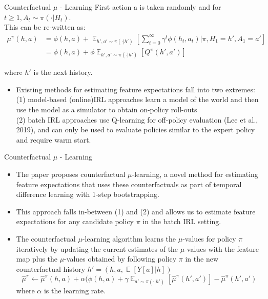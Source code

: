 \documentclass{beamer}
\DeclareMathOperator{\EX}{\mathbb{E}}%
\begin{document}
\begin{frame}{Counterfactual $\mu$ - Learning}
    First action a is taken randomly and for $t \geq 1, A_t \sim \pi(\cdot | H_t)$. \\
    This can be re-written as:
    \vspace{-0.3cm}
    \begin{equation*}
        \begin{split}
            \mu^\pi(h,a) & = \phi(h,a) + \EX_{h', a' \sim \pi(\cdot|h')} [\sum_{t=0}^\infty\gamma^t \phi(h_t, a_t) | \pi, H_1 = h', A_1 = a'] \\
             & = \phi(h,a) + \phi\EX_{h', a' \sim \pi(\cdot|h')} [Q^\pi(h', a')]
        \end{split}
    \end{equation*}

    where $h'$ is the next history.

    \begin{itemize}
        \item Existing methods for estimating feature expectations fall into two extremes: \\
        (1) model-based (online)IRL approaches learn a model of the world and then use the model as a simulator to obtain on-policy roll-outs  \\
        (2) batch IRL approaches use Q-learning for off-policy evaluation (Lee et al., 2019), and can only be used to evaluate policies similar to the expert policy and require warm start.
    \end{itemize}
    
\end{frame}

\begin{frame}{Counterfactual $\mu$ - Learning}
    \begin{itemize}
        \item The paper proposes counterfactual $\mu$-learning, a novel method for estimating feature expectations that uses these counterfactuals as part of temporal difference learning with 1-step bootstrapping. 
        \item This approach falls in-between (1) and (2) and allows us to estimate feature expectations for any candidate policy $\pi$ in the batch IRL setting.
        \item The counterfactual $\mu$-learning algorithm learns the $\mu$-values for policy $\pi$ iteratively by updating the current estimates of the $\mu$-values with the feature map plus the $\mu$-values obtained by following policy $\pi$ in the new counterfactual history $h' = (h, a , \EX[Y[a]|h])$
        \begin{equation*}
            \hat{\mu}^\pi \xleftarrow{} \hat{\mu}^\pi(h,a) + \alpha(\phi(h,a) + \gamma \EX_{a' \sim \pi(\cdot|h')}[\hat{\mu}^\pi(h', a')] -  \hat{\mu}^\pi(h', a')
        \end{equation*}
        where $\alpha$ is the learning rate.
    \end{itemize}
    
\end{frame}
\end{document}
